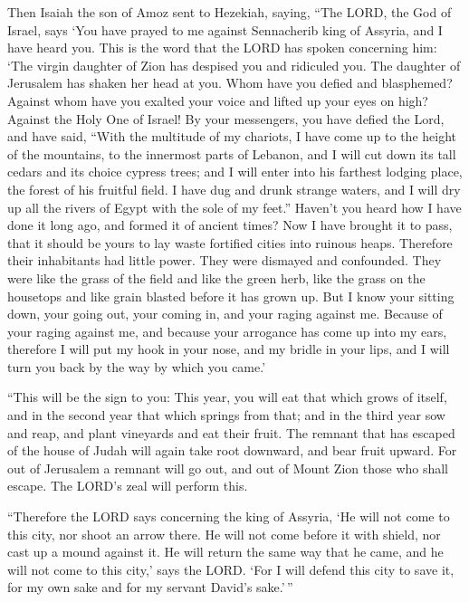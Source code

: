  Then Isaiah the son of Amoz sent to Hezekiah, saying,
``The LORD, the God of Israel, says `You have prayed to me against
Sennacherib king of Assyria, and I have heard you.  This
is the word that the LORD has spoken concerning him: `The virgin
daughter of Zion has despised you and ridiculed you. The daughter of
Jerusalem has shaken her head at you.  Whom have you
defied and blasphemed? Against whom have you exalted your voice and
lifted up your eyes on high? Against the Holy One of Israel!
 By your messengers, you have defied the Lord, and have
said, ``With the multitude of my chariots, I have come up to the height
of the mountains, to the innermost parts of Lebanon, and I will cut down
its tall cedars and its choice cypress trees; and I will enter into his
farthest lodging place, the forest of his fruitful field.
 I have dug and drunk strange waters, and I will dry up
all the rivers of Egypt with the sole of my feet.'' 
Haven't you heard how I have done it long ago, and formed it of ancient
times? Now I have brought it to pass, that it should be yours to lay
waste fortified cities into ruinous heaps.  Therefore
their inhabitants had little power. They were dismayed and confounded.
They were like the grass of the field and like the green herb, like the
grass on the housetops and like grain blasted before it has grown up.
 But I know your sitting down, your going out, your
coming in, and your raging against me.  Because of your
raging against me, and because your arrogance has come up into my ears,
therefore I will put my hook in your nose, and my bridle in your lips,
and I will turn you back by the way by which you came.'

 ``This will be the sign to you: This year, you will eat
that which grows of itself, and in the second year that which springs
from that; and in the third year sow and reap, and plant vineyards and
eat their fruit.  The remnant that has escaped of the
house of Judah will again take root downward, and bear fruit upward.
 For out of Jerusalem a remnant will go out, and out of
Mount Zion those who shall escape. The LORD's zeal will perform this.

 ``Therefore the LORD says concerning the king of
Assyria, `He will not come to this city, nor shoot an arrow there. He
will not come before it with shield, nor cast up a mound against it.
 He will return the same way that he came, and he will
not come to this city,' says the LORD.  `For I will
defend this city to save it, for my own sake and for my servant David's
sake.'\,''

